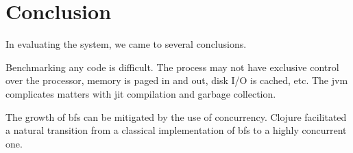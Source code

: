 	\section{Conclusion}
	\label{sec:eval-conclusion}
		In evaluating the system, we came to several conclusions.
		
		Benchmarking any code is difficult.  The process may not have exclusive control over the processor, memory is paged in and out, disk I/O is cached, etc.  The \gls{jvm} complicates matters with \gls{jit} compilation and garbage collection.
		
		The growth of \gls{bfs} can be mitigated by the use of concurrency.  Clojure facilitated a natural transition from a classical implementation of \gls{bfs} to a highly concurrent one.